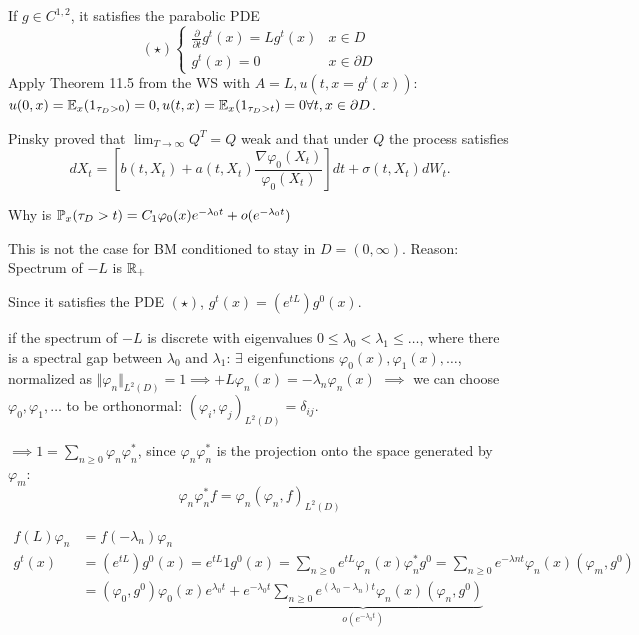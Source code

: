 \begin{remark}
    If $g\in C^{1,2}$, it satisfies the parabolic PDE 
    \[(\star)\begin{cases}\frac{\partial}{\partial t}g^t(x)=L g^t(x) & x\in D\\ g^t(x)=0 & x\in\partial D\end{cases}\]
    Apply Theorem 11.5 from the WS with $A=L,u(t,x=g^t(x))$: 
    $u(0,x)=\mathbb{E}_x(1_{\tau_D>0})=0,u(t,x)=\mathbb{E}_x(1_{\tau_D>t})=0\forall t,x\in\partial D$.
\end{remark}

Pinsky proved that $\lim_{T\to\infty} Q^T=Q$ weak and that under $Q$ the process satisfies
\[dX_t = \left[b(t,X_t)+a(t,X_t)\frac{\nabla \varphi_0(X_t)}{\varphi_0(X_t)} \right]dt +\sigma(t,X_t)dW_t.\]


Why is $\mathbb{P}_x(\tau_D>t)=C_1\varphi_0(x)e^{-\lambda_0 t}+o(e^{-\lambda_0t})$

\begin{aremark}

    This is not the case for BM conditioned to stay in $D=(0,\infty)$. Reason: Spectrum of $-L$ is $\mathbb{R}_+$

\end{aremark}

Since it satisfies the PDE $(\star)$, $g^t(x)=(e^{tL})g^0(x)$.

if the spectrum of $-L$ is discrete with eigenvalues $0\leq \lambda_0<\lambda_1\leq \dots$, where 
there is a spectral gap between $\lambda_0$ and $\lambda_1$: $\exists$ eigenfunctions $\varphi_0(x),\varphi_1(x),\dots$,
normalized  as $\Vert \varphi_n\Vert_{L^2(D)}=1\implies +L\varphi_n(x)=-\lambda_n\varphi_n(x)$
$\implies$ we can choose $\varphi_0,\varphi_1,\dots$ to be orthonormal: $(\varphi_i,\varphi_j)_{L^2(D)}=\delta_{ij}$. 

$\implies 1=\sum_{n\geq 0}\varphi_n\varphi_n^*$, since $\varphi_n\varphi_n^*$ is the projection onto 
the space generated by $\varphi_m$:
\[\varphi_n\varphi_n^* f=\varphi_n (\varphi_n,f)_{L^2(D)}\]

\begin{align*}
    f(L)\varphi_n&=f(-\lambda_n)\varphi_n\\
    g^t(x)&=(e^{tL})g^0(x)=e^{tL}1g^0(x)=\sum_{n\geq 0}e^{tL}\varphi_n(x)\varphi_n^*g^0=\sum_{n\geq 0} e^{-\lambda n t}\varphi_n(x)(\varphi_m,g^0)\\
    &=(\varphi_0,g^0)\varphi_0(x)e^{\lambda_0t}+\underbrace{e^{-\lambda_0 t}\sum_{n\geq 0}e^{(\lambda_0-\lambda_n)t}\varphi_n(x)(\varphi_n,g^0)}_{o(e^{-\lambda_0 t})}
\end{align*}


